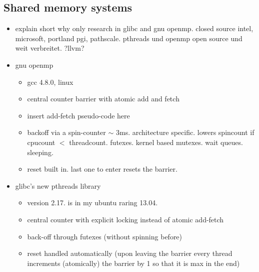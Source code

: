 \documentclass[a4paper, 10pt]{article}
\begin{document}
\subsection{Shared memory systems}
\begin{itemize}
	\item explain short why only research in glibc and gnu openmp. closed source intel, microsoft, portland pgi, pathscale. pthreads und openmp open source und weit verbreitet. ?llvm?
	\item gnu openmp
		\begin{itemize}
			\item gcc 4.8.0, linux
			\item central counter barrier with atomic add and fetch
			\item insert add-fetch pseudo-code here
			\item backoff via a spin-counter $\sim$ 3ms. architecture specific. lowers spincount if cpucount $<$ threadcount. futexes. kernel based mutexes. wait queues. sleeping.
			\item reset built in. last one to enter resets the barrier.
		\end{itemize}
	\item glibc's new pthreads library
		\begin{itemize}
			\item version 2.17. is in my ubuntu raring 13.04.
			\item central counter with explicit locking instead of atomic add-fetch
			\item back-off through futexes (without spinning before)
			\item reset handled automatically (upon leaving the barrier every thread increments (atomically) the barrier by 1 so that it is max in the end)
		\end{itemize}
\end{itemize}
\end{document}
